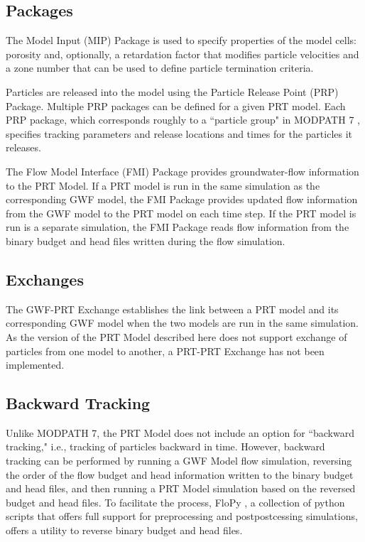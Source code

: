 \subsection{Packages} \label{sec:packages}

The Model Input (MIP) Package is used to specify properties of the model cells: porosity and, optionally, a retardation factor that modifies particle velocities and a zone number that can be used to define particle termination criteria.

Particles are released into the model using the Particle Release Point (PRP) Package. Multiple PRP packages can be defined for a given PRT model. Each PRP package, which corresponds roughly to a ``particle group" in MODPATH 7 \citep{pollock2016modpath7}, specifies tracking parameters and release locations and times for the particles it releases.

The Flow Model Interface (FMI) Package provides groundwater-flow information to the PRT Model. If a PRT model is run in the same simulation as the corresponding GWF model, the FMI Package provides updated flow information from the GWF model to the PRT model on each time step. If the PRT model is run is a separate simulation, the FMI Package reads flow information from the binary budget and head files written during the flow simulation.

\subsection{Exchanges} \label{sec:exchanges}

The GWF-PRT Exchange establishes the link between a PRT model and its corresponding GWF model when the two models are run in the same simulation. As the version of the PRT Model described here does not support exchange of particles from one model to another, a PRT-PRT Exchange has not been implemented.

\subsection{Backward Tracking} \label{sec:backwardtracking}

Unlike MODPATH 7, the PRT Model does not include an option for ``backward tracking," i.e., tracking of particles backward in time. However, backward tracking can be performed by running a GWF Model flow simulation, reversing the order of the flow budget and head information written to the binary budget and head files, and then running a PRT Model simulation based on the reversed budget and head files. To facilitate the process, FloPy \citep{bakker2016flopy, hughes2023flopy, flopysoftware}, a collection of python scripts that offers full support for preprocessing and postpostcessing \mf simulations, offers a utility to reverse binary budget and head files.

